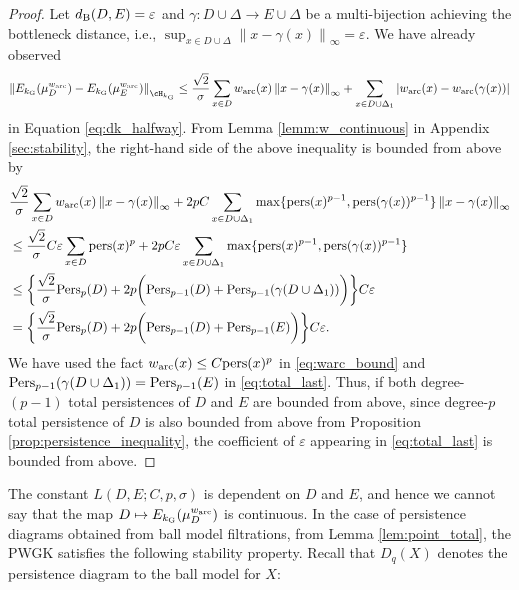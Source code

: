 \documentclass{article}
\newcommand{\DD}{{\Delta}}
\newcommand{\ee}{{\varepsilon}}
\newcommand{\ra}{{\rightarrow}}
\newcommand{\Pers}{{\rm Pers}}
\newcommand{\pers}{{\rm pers}}
\providecommand{\abs}[1]{\left\lvert#1\right\rvert}
\providecommand{\norm}[1]{\left\lVert#1\right\rVert}
\providecommand{\dk}[4]{\norm{E_{#1}(\mu^{#2}_{#3}) - E_{#1}(\mu^{#2}_{#4})}_{\cH_{#1}}}
\begin{document}
\begin{proof}
Let $d_{{\rm B}}(D,E) = \ee$ and $\gamma:D \cup \DD \ra E \cup \DD$ be a multi-bijection achieving the bottleneck distance, i.e., $\sup_{x \in D \cup \DD} \norm{x- \gamma(x)}_{\infty} = \ee$. We have already observed 
\begin{align*}
\dk{k_{{\rm G}}}{w_{{\rm arc}}}{D}{E} \leq  \frac{\sqrt{2}}{\sigma}\sum_{x \in D} w_{{\rm arc}}(x) \norm{x-\gamma(x)}_{\infty}+ \sum_{x \in D \cup \DD_{1}} \abs{w_{{\rm arc}}(x)-w_{{\rm arc}}(\gamma(x))}
\end{align*}
in Equation \eqref{eq:dk_halfway}. 
From Lemma \ref{lemm:w_continuous} in Appendix \ref{sec:stability}, the right-hand side of the above inequality is bounded from above by
\begin{align}
&  \frac{\sqrt{2}}{\sigma} \sum_{x \in D} w_{{\rm arc}}(x) \norm{x-\gamma(x)}_{\infty} + 2pC \sum_{x \in D \cup \DD_{1}}  \max \{\pers(x)^{p-1}, \pers(\gamma(x))^{p-1}\} \norm{x-\gamma(x)}_{\infty} \nonumber \\
& \leq  \frac{\sqrt{2}}{\sigma} C \ee \sum_{x \in D} \pers(x)^{p}  + 2pC \ee \sum_{x \in D \cup \DD_{1}} \max \{ \pers(x)^{p-1},    \pers(\gamma(x))^{p-1} \}   \label{eq:warc_bound} \\
& \leq \biggl\{ \frac{\sqrt{2}}{\sigma} \Pers_{p}(D)+ 2p \biggl( \Pers_{p-1}(D) + \Pers_{p-1}(\gamma(D \cup \DD_{1})) \biggr) \biggr\} C \ee \nonumber \\
&= \biggl\{ \frac{\sqrt{2}}{\sigma} \Pers_{p}(D)+ 2p  \biggl( \Pers_{p-1}(D) + \Pers_{p-1}(E) \biggr)  \biggr\} C \ee \label{eq:total_last}.
\end{align}
We have used the fact $w_{\rm arc}(x)\leq C \pers(x)^p$ in \eqref{eq:warc_bound} and $\Pers_{p-1}(\gamma(D \cup \DD_{1})) = \Pers_{p-1}(E)$ in \eqref{eq:total_last}.
Thus, if both degree-$(p-1)$ total persistences of $D$ and $E$ are bounded from above, since degree-$p$ total persistence of $D$ is also bounded from above from Proposition \ref{prop:persistence_inequality}, the coefficient of $\ee$ appearing in \eqref{eq:total_last} is bounded from above.
\end{proof}

The constant $L(D,E;C,p,\sigma)$ is dependent on $D$ and $E$, and hence we cannot say that the map $D \mapsto E_{k_{{\rm G}}}(\mu^{w_{\rm arc}}_{D})$ is continuous.
In the case of persistence diagrams obtained from ball model filtrations, from Lemma \ref{lem:point_total}, the PWGK satisfies the following stability property.
Recall that $D_{q}(X)$ denotes the persistence diagram to the ball model for $X$:
\end{document}
